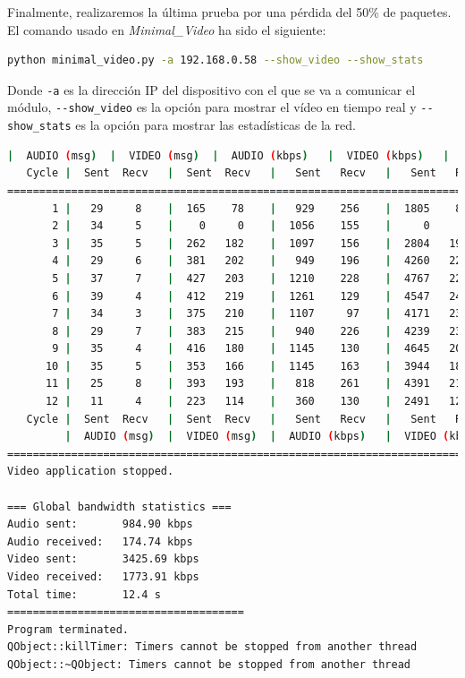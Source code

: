 Finalmente, realizaremos la última prueba por una pérdida del 50\% de paquetes. El comando usado en \textit{Minimal\_Video} ha sido el siguiente:

\begin{lstlisting}[language=bash]
python minimal_video.py -a 192.168.0.58 --show_video --show_stats
\end{lstlisting}
Donde \verb|-a| es la dirección IP del dispositivo con el que se va a comunicar el módulo, \verb|--show_video| es la opción para mostrar el vídeo en tiempo real y \verb|--show_stats| es la opción para mostrar las estadísticas de la red.
\vspace{\baselineskip}

\begin{lstlisting}[language=bash,basicstyle=\ttfamily\tiny]
         |  AUDIO (msg)  |  VIDEO (msg)  |  AUDIO (kbps)   |  VIDEO (kbps)   |     CPU (%) 
   Cycle |  Sent  Recv   |  Sent  Recv   |   Sent   Recv   |   Sent   Recv   | Program System
================================================================================================
       1 |   29     8    |  165    78    |   929    256    |  1805    854    |  31    100       
       2 |   34     5    |    0     0    |  1056    155    |     0      0    |  47     74       
       3 |   35     5    |  262   182    |  1097    156    |  2804   1949    |  31     75       
       4 |   29     6    |  381   202    |   949    196    |  4260   2256    |  28     73       
       5 |   37     7    |  427   203    |  1210    228    |  4767   2267    |  25     70       
       6 |   39     4    |  412   219    |  1261    129    |  4547   2418    |  35     70       
       7 |   34     3    |  375   210    |  1107     97    |  4171   2334    |  39     67       
       8 |   29     7    |  383   215    |   940    226    |  4239   2377    |  35     67       
       9 |   35     4    |  416   180    |  1145    130    |  4645   2012    |  37     71       
      10 |   35     5    |  353   166    |  1145    163    |  3944   1854    |  34     72       
      11 |   25     8    |  393   193    |   818    261    |  4391   2158    |  35     66       
      12 |   11     4    |  223   114    |   360    130    |  2491   1275    |  16     42       
   Cycle |  Sent  Recv   |  Sent  Recv   |   Sent   Recv   |   Sent   Recv   | Program System
         |  AUDIO (msg)  |  VIDEO (msg)  |  AUDIO (kbps)   |  VIDEO (kbps)   |     CPU (%) 
===========================================================================================
Video application stopped.

=== Global bandwidth statistics ===
Audio sent:       984.90 kbps
Audio received:   174.74 kbps
Video sent:       3425.69 kbps
Video received:   1773.91 kbps
Total time:       12.4 s
=====================================
Program terminated.
QObject::killTimer: Timers cannot be stopped from another thread
QObject::~QObject: Timers cannot be stopped from another thread
\end{lstlisting}

